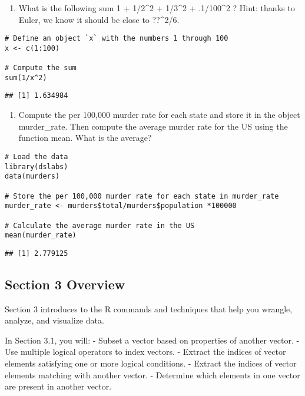 \documentclass[
]{article}
\providecommand{\tightlist}{%
  \setlength{\itemsep}{0pt}\setlength{\parskip}{0pt}}
\begin{document}
\begin{enumerate}
\def\labelenumi{\arabic{enumi}.}
\setcounter{enumi}{1}
\tightlist
\item
  What is the following sum 1 + 1/2\^{}2 + 1/3\^{}2 + .1/100\^{}2 ?
  Hint: thanks to Euler, we know it should be close to ??\^{}2/6.
\end{enumerate}

\begin{verbatim}
# Define an object `x` with the numbers 1 through 100
x <- c(1:100)

# Compute the sum 
sum(1/x^2)
\end{verbatim}

\begin{verbatim}
## [1] 1.634984
\end{verbatim}

\begin{enumerate}
\def\labelenumi{\arabic{enumi}.}
\setcounter{enumi}{2}
\tightlist
\item
  Compute the per 100,000 murder rate for each state and store it in the
  object murder\_rate. Then compute the average murder rate for the US
  using the function mean. What is the average?
\end{enumerate}

\begin{verbatim}
# Load the data
library(dslabs)
data(murders)

# Store the per 100,000 murder rate for each state in murder_rate
murder_rate <- murders$total/murders$population *100000

# Calculate the average murder rate in the US 
mean(murder_rate)
\end{verbatim}

\begin{verbatim}
## [1] 2.779125
\end{verbatim}

\hypertarget{section-3-overview}{%
\subsection{Section 3 Overview}\label{section-3-overview}}

Section 3 introduces to the R commands and techniques that help you
wrangle, analyze, and visualize data.

In Section 3.1, you will: - Subset a vector based on properties of
another vector. - Use multiple logical operators to index vectors. -
Extract the indices of vector elements satisfying one or more logical
conditions. - Extract the indices of vector elements matching with
another vector. - Determine which elements in one vector are present in
another vector.
\end{document}
